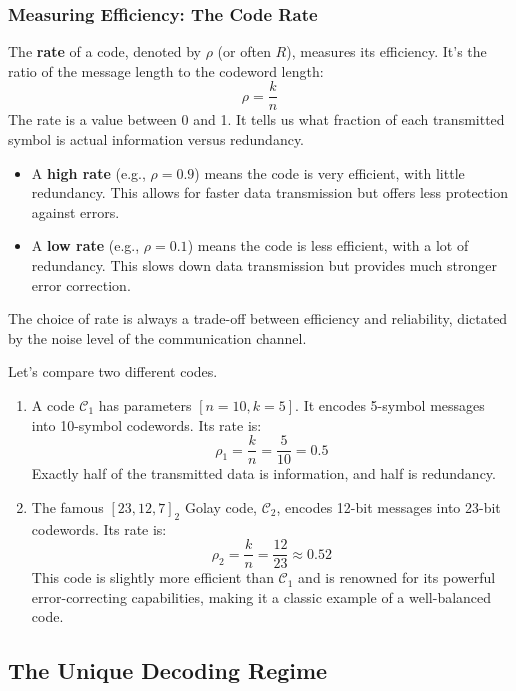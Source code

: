 \documentclass{article}
\begin{document}
\subsubsection{Measuring Efficiency: The Code Rate}
The \textbf{rate} of a code, denoted by $\rho$ (or often $R$), measures its efficiency. It's the ratio of the message length to the codeword length:
\[
\rho = \frac{k}{n}
\]
The rate is a value between 0 and 1. It tells us what fraction of each transmitted symbol is actual information versus redundancy.
\begin{itemize}
    \item A \textbf{high rate} (e.g., $\rho = 0.9$) means the code is very efficient, with little redundancy. This allows for faster data transmission but offers less protection against errors.
    \item A \textbf{low rate} (e.g., $\rho = 0.1$) means the code is less efficient, with a lot of redundancy. This slows down data transmission but provides much stronger error correction.
\end{itemize}
The choice of rate is always a trade-off between efficiency and reliability, dictated by the noise level of the communication channel.

\begin{tcolorbox}[title={Example: Comparing Code Rates}]
Let's compare two different codes.
\begin{enumerate}
    \item A code $\mathcal{C}_1$ has parameters $[n=10, k=5]$. It encodes 5-symbol messages into 10-symbol codewords. Its rate is:
    \[ \rho_1 = \frac{k}{n} = \frac{5}{10} = 0.5 \]
    Exactly half of the transmitted data is information, and half is redundancy.

    \item The famous $[23, 12, 7]_2$ Golay code, $\mathcal{C}_2$, encodes 12-bit messages into 23-bit codewords. Its rate is:
    \[ \rho_2 = \frac{k}{n} = \frac{12}{23} \approx 0.52 \]
    This code is slightly more efficient than $\mathcal{C}_1$ and is renowned for its powerful error-correcting capabilities, making it a classic example of a well-balanced code.
\end{enumerate}
\end{tcolorbox}


\subsection{The Unique Decoding Regime}
\end{document}
